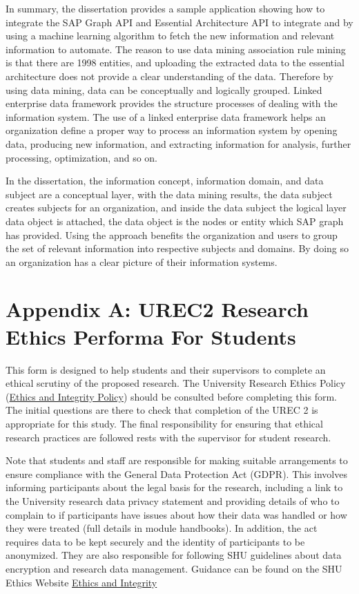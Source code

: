 \documentclass{article}
\begin{document}
In summary, the dissertation provides a sample application showing how to integrate the SAP Graph API and Essential Architecture API to integrate and by using a machine learning algorithm to fetch the new information and relevant information to automate. The reason to use data mining association rule mining is that there are 1998 entities, and uploading the extracted data to the essential architecture does not provide a clear understanding of the data. Therefore by using data mining, data can be conceptually and logically grouped. Linked enterprise data framework provides the structure processes of dealing with the information system. The use of a linked enterprise data framework helps an organization define a proper way to process an information system by opening data, producing new information, and extracting information for analysis, further processing, optimization, and so on. \parencite{galkin2016}

In the dissertation, the information concept, information domain, and data subject are a conceptual layer, with the data mining results, the data subject creates subjects for an organization, and inside the data subject the logical layer data object is attached, the data object is the nodes or entity which SAP graph has provided. Using the approach benefits the organization and users to group the set of relevant information into respective subjects and domains. By doing so an organization has a clear picture of their information systems.

\newpage
\printbibliography

\newpage
\appendix

\section{Appendix A: UREC2 Research Ethics Performa For Students}


This form is designed to help students and their supervisors to complete an ethical scrutiny of the proposed research. The University Research Ethics Policy (\href{www.shu.ac.uk/research/excellence/ethics-and-integrity/policies}{Ethics and Integrity Policy}) should be consulted before completing this form. The initial questions are there to check that completion of the UREC 2 is appropriate for this study. The final responsibility for ensuring that ethical research practices are followed rests with the supervisor for student research.

Note that students and staff are responsible for making suitable arrangements to ensure compliance with the General Data Protection Act (GDPR). This involves informing participants about the legal basis for the research, including a link to the University research data privacy statement and providing details of who to complain to if participants have issues about how their data was handled or how they were treated (full details in module handbooks).  In addition, the act requires data to be kept securely and the identity of participants to be anonymized. They are also responsible for following SHU guidelines about data encryption and research data management. Guidance can be found on the SHU Ethics Website \href{www.shu.ac.uk/research/excellence/ethics-and-integrity}{Ethics and Integrity}
\end{document}
